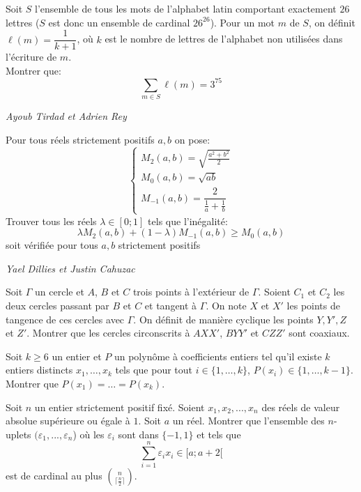 \begin{exo}{}
Soit $S$ l'ensemble de tous les mots de l'alphabet latin comportant exactement $26$ lettres ($S$ est donc un ensemble de cardinal $26^{26}$). Pour un mot $m$ de $S$, on définit $\ell(m) = \dfrac{1}{k+1}$, où $k$ est le nombre de lettres de l'alphabet non utilisées dans l'écriture de $m$. \\
Montrer que:
\[ \displaystyle \sum_{m \in S} \ell(m) = 3^{75} \]

\medskip
\textit{Ayoub Tirdad et Adrien Rey}
\end{exo}

\begin{exo}{}
Pour tous réels strictement positifs $a,b$ on pose:
$$\begin{cases} M_2(a,b)=\sqrt{\frac{a^2+b^2}{2}}\\M_0(a,b)=\sqrt{ab}\\M_{-1}(a,b)=\dfrac{2}{\frac{1}{a}+\frac{1}{b}}\end{cases}$$
Trouver tous les réels $\lambda\in [0;1]$ tels que l'inégalité:
$$\lambda M_2(a,b)+(1-\lambda)M_{-1}(a,b)\ge M_0(a,b)$$
soit vérifiée pour tous $a,b$ strictement positifs

\medskip
\textit{Yael Dillies et Justin Cahuzac}
\end{exo}




\begin{exo}{}
Soit $\Gamma$ un cercle et $A$, $B$ et $C$ trois points à l'extérieur de $\Gamma$. Soient $C_1$ et $C_2$ les deux cercles passant par $B$ et $C$ et tangent à $\Gamma$. On note $X$ et $X'$ les points de tangence de ces cercles avec $\Gamma$. On définit de manière cyclique les points $Y,Y',Z$ et $Z'$. Montrer que les cercles circonscrits à $AXX'$, $BYY'$ et $CZZ'$ sont coaxiaux.
\end{exo}




\begin{exo}{} Soit $k\geq 6$ un entier  et $P$ un polynôme à coefficients entiers tel qu'il existe $k$ entiers distincts $x_1,\ldots,x_k$ tels que pour tout $i\in \{1,\ldots,k\}$, $P(x_i) \in \{1,\ldots,k-1\}$. Montrer que $P(x_1) = \ldots = P(x_k)$.
\end{exo}

\begin{exo}{}
Soit $n$ un entier strictement positif fixé. Soient $x_1, x_2,..., x_n$ des réels de valeur
absolue supérieure ou égale à $1$. Soit $a$ un réel. Montrer que l’ensemble des $n$-uplets $(\varepsilon_1,...,\varepsilon_n$)
où les $\varepsilon_i$ sont dans $\{-1,1\}$ et tels que
$$\sum\limits_{i=1}^n \varepsilon_i x_i \in [a;a+2[$$
est de cardinal au plus $\binom{n}{\lceil \frac{n}{2}\rceil}$.
\end{exo}

